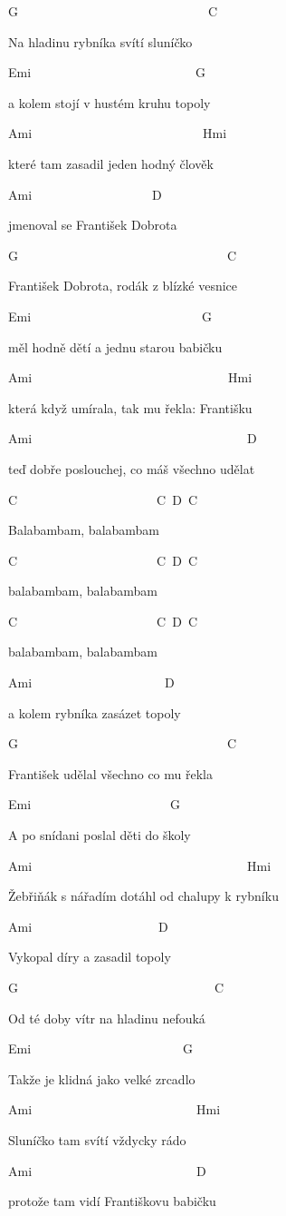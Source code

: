 
G~~~~~~~~~~~~~~~~~~~~~~~~~~~~~~C

Na hladinu rybníka svítí sluníčko

Emi~~~~~~~~~~~~~~~~~~~~~~~~~~G

a kolem stojí v hustém kruhu topoly

Ami~~~~~~~~~~~~~~~~~~~~~~~~~~~Hmi

které tam zasadil jeden hodný člověk

Ami~~~~~~~~~~~~~~~~~~~D

jmenoval se František Dobrota

\bigskip

G~~~~~~~~~~~~~~~~~~~~~~~~~~~~~~~~~C

František Dobrota, rodák z blízké vesnice

Emi~~~~~~~~~~~~~~~~~~~~~~~~~~~G

měl hodně dětí a jednu starou babičku

Ami~~~~~~~~~~~~~~~~~~~~~~~~~~~~~~~Hmi

která když umírala, tak mu řekla: Františku

Ami~~~~~~~~~~~~~~~~~~~~~~~~~~~~~~~~~~D

teď dobře poslouchej, co máš všechno udělat

\bigskip

C~~~~~~~~~~~~~~~~~~~~~~C~D~C

Balabambam, balabambam

C~~~~~~~~~~~~~~~~~~~~~~C~D~C

balabambam, balabambam

C~~~~~~~~~~~~~~~~~~~~~~C~D~C

balabambam, balabambam

Ami~~~~~~~~~~~~~~~~~~~~~D

a kolem rybníka zasázet topoly

\bigskip

G~~~~~~~~~~~~~~~~~~~~~~~~~~~~~~~~~C

František udělal všechno co mu řekla

Emi~~~~~~~~~~~~~~~~~~~~~~G

A po snídani poslal děti do školy

Ami~~~~~~~~~~~~~~~~~~~~~~~~~~~~~~~~~~Hmi

Žebřiňák s nářadím dotáhl od chalupy k rybníku

Ami~~~~~~~~~~~~~~~~~~~~D

Vykopal díry a zasadil topoly

\bigskip

G~~~~~~~~~~~~~~~~~~~~~~~~~~~~~~~C

Od té doby vítr na hladinu nefouká

Emi~~~~~~~~~~~~~~~~~~~~~~~~G

Takže je klidná jako velké zrcadlo

Ami~~~~~~~~~~~~~~~~~~~~~~~~~~Hmi

Sluníčko tam svítí vždycky rádo

Ami~~~~~~~~~~~~~~~~~~~~~~~~~~D

protože tam vidí Františkovu babičku